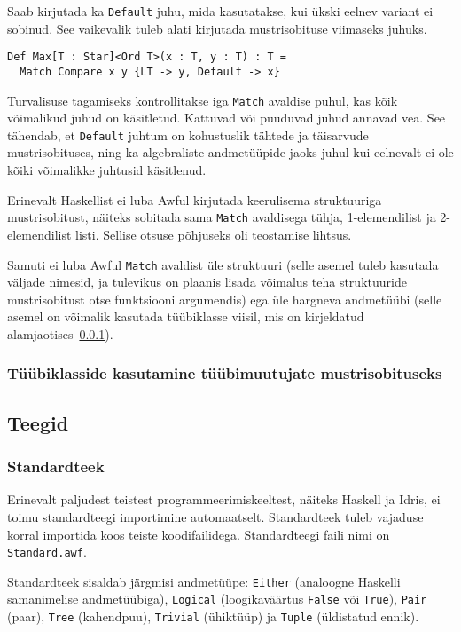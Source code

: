 \documentclass[12pt]{article}
\begin{document}
        Saab kirjutada ka \verb!Default! juhu, mida kasutatakse, kui ükski eelnev variant ei sobinud. See vaikevalik tuleb alati kirjutada mustrisobituse viimaseks juhuks.

        \begin{verbatim}Def Max[T : Star]<Ord T>(x : T, y : T) : T =
  Match Compare x y {LT -> y, Default -> x}\end{verbatim}

        Turvalisuse tagamiseks kontrollitakse iga \verb!Match! avaldise puhul, kas kõik võimalikud juhud on käsitletud. Kattuvad või puuduvad juhud annavad vea. See tähendab, et \verb!Default! juhtum on kohustuslik tähtede ja täisarvude mustrisobituses, ning ka algebraliste andmetüüpide jaoks juhul kui eelnevalt ei ole kõiki võimalikke juhtusid käsitlenud.

        Erinevalt Haskellist ei luba Awful kirjutada keerulisema struktuuriga mustrisobitust, näiteks sobitada sama \verb!Match! avaldisega tühja, 1-elemendilist ja 2-elemendilist listi. Sellise otsuse põhjuseks oli teostamise lihtsus.

        Samuti ei luba Awful \verb!Match! avaldist üle struktuuri (selle asemel tuleb kasutada väljade nimesid, ja tulevikus on plaanis lisada võimalus teha struktuuride mustrisobitust otse funktsiooni argumendis) ega üle hargneva andmetüübi (selle asemel on võimalik kasutada tüübiklasse viisil, mis on kirjeldatud alamjaotises~\ref{tyybiklassihakk}).
      \subsubsection{Tüübiklasside kasutamine tüübimuutujate mustrisobituseks}\label{tyybiklassihakk}
        
    \subsection{Teegid}
      
      \subsubsection{Standardteek}
        Erinevalt paljudest teistest programmeerimiskeeltest, näiteks Haskell ja Idris, ei toimu standardteegi importimine automaatselt. Standardteek tuleb vajaduse korral importida koos teiste koodifailidega. Standardteegi faili nimi on \verb!Standard.awf!.

        Standardteek sisaldab järgmisi andmetüüpe: \verb!Either! (analoogne Haskelli samanimelise andmetüübiga),  \verb!Logical! (loogikaväärtus \verb!False! või \verb!True!), \verb!Pair! (paar), \verb!Tree! (kahendpuu), \verb!Trivial! (ühiktüüp) ja \verb!Tuple! (üldistatud ennik).
\end{document}
